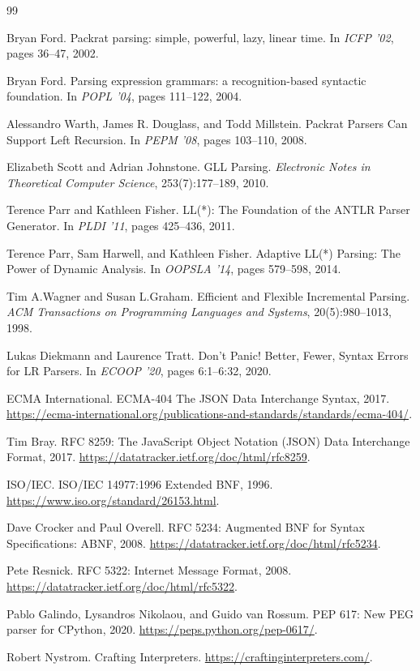 \begin{thebibliography}{99}
\clearpage
    \item Bryan Ford. Packrat parsing: simple, powerful, lazy, linear time. In \textit{ICFP ’02}, pages 36–47, 2002.
    \item Bryan Ford. Parsing expression grammars: a recognition-based syntactic foundation. In \textit{POPL ’04}, pages 111–122, 2004.
    \item Alessandro Warth, James R. Douglass, and Todd Millstein. Packrat Parsers Can Support Left Recursion. In \textit{PEPM ’08}, pages 103–110, 2008.
    \item Elizabeth Scott and Adrian Johnstone. GLL Parsing. \textit{Electronic Notes in Theoretical Computer Science}, 253(7):177–189, 2010.
    \item Terence Parr and Kathleen Fisher. LL(*): The Foundation of the ANTLR Parser Generator. In \textit{PLDI ’11}, pages 425–436, 2011.
    \item Terence Parr, Sam Harwell, and Kathleen Fisher. Adaptive LL(*) Parsing: The Power of Dynamic Analysis. In \textit{OOPSLA ’14}, pages 579–598, 2014.
    \item Tim A.Wagner and Susan L.Graham. Efficient and Flexible Incremental Parsing. \textit{ACM Transactions on Programming Languages and Systems}, 20(5):980–1013, 1998.
    \item Lukas Diekmann and Laurence Tratt. Don’t Panic! Better, Fewer, Syntax Errors for LR Parsers. In \textit{ECOOP ’20}, pages 6:1–6:32, 2020.
    \item ECMA International. ECMA-404 The JSON Data Interchange Syntax, 2017. \url{https://ecma-international.org/publications-and-standards/standards/ecma-404/}.
    \item Tim Bray. RFC 8259: The JavaScript Object Notation (JSON) Data Interchange Format, 2017. \url{https://datatracker.ietf.org/doc/html/rfc8259}.
    \item ISO/IEC. ISO/IEC 14977:1996 Extended BNF, 1996. \url{https://www.iso.org/standard/26153.html}.
    \item Dave Crocker and Paul Overell. RFC 5234: Augmented BNF for Syntax Specifications: ABNF, 2008. \url{https://datatracker.ietf.org/doc/html/rfc5234}.
    \item Pete Resnick. RFC 5322: Internet Message Format, 2008. \url{https://datatracker.ietf.org/doc/html/rfc5322}.
    \item Pablo Galindo, Lysandros Nikolaou, and Guido van Rossum. PEP 617: New PEG parser for CPython, 2020. \url{https://peps.python.org/pep-0617/}.
    \item Robert Nystrom. Crafting Interpreters. \url{https://craftinginterpreters.com/}.

\end{thebibliography}
